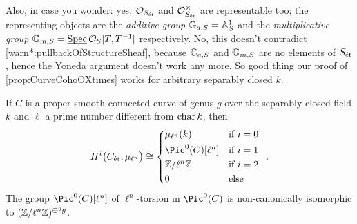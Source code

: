 Also, in case you wonder: yes, $\mathcal{O}_{S_{\mathrm{\acute{e}t}}}$ and $\mathcal{O}_{S_{\mathrm{\acute{e}t}}}^\times$ are representable too; the representing objects are the \emph{additive group} $\mathbb{G}_{a,S}= \mathbb{A}_S^1$ and the \emph{multiplicative group} $\mathbb{G}_{m,S}= \operatorname{\underline{\smash{\mathrm{Spec}}}} \mathcal{O}_S[T,T^{-1}]$ respectively. No, this doesn't contradict \cref{warn*:pullbackOfStructureSheaf}, because $\mathbb{G}_{a,S}$ and $\mathbb{G}_{m,S}$ are no elements of $S_{\mathrm{\acute{e}t}}$, hence the Yoneda argument doesn't work any more. So good thing our proof of \cref{prop:CurveCohoOXtimes} works for arbitrary separably closed $k$.
\begin{cor}\label{cor:cohoOfmu}
	If $C$ is a proper smooth connected curve of genus $g$ over the separably closed field $k$ and $\ell$ a prime number different from $\operatorname{char} k$, then
	\begin{equation*}
		H^i\big(C_\et,\mu_{\ell^n}\big)\cong \begin{cases*}
			\mu_{\ell^n}(k) & if $i=0$\\
			\Pic^0(C)[\ell^n] & if $i=1$\\
			\IZ/\ell^n\IZ & if $i=2$ \\
			0 & else
		\end{cases*}\,.
	\end{equation*}
 	The group $\Pic^0(C)[\ell^n]$ of $\ell^n$-torsion in $\Pic^0(C)$ is non-canonically isomorphic to $(\mathbb{Z}/\ell^n\mathbb{Z})^{\oplus2g}$.
\end{cor}
